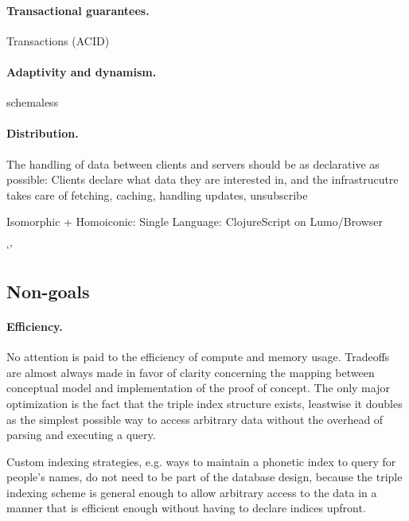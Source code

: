 \paragraph{Transactional guarantees.}
Transactions (ACID)


\paragraph{Adaptivity and dynamism.}
schemaless


\paragraph{Distribution.}
The handling of data between clients and servers should be as declarative as possible: Clients declare what data they are interested in, and the infrastrucutre takes care of fetching, caching, handling updates, unsubscribe

Isomorphic + Homoiconic: Single Language: ClojureScript on Lumo/Browser




`'\subsection{Non-goals}\label{sec:nongoals}


\paragraph{Efficiency.}
No attention is paid to the efficiency of compute and memory usage. Tradeoffs are almost always made in favor of clarity concerning the mapping between conceptual model and implementation of the proof of concept. The only major optimization is the fact that the triple index structure exists, leastwise it doubles as the simplest possible way to access arbitrary data without the overhead of parsing and executing a query.

Custom indexing strategies, e.g. ways to maintain a phonetic index to query for people's names, do not need to be part of the database design, because the triple indexing scheme is general enough to allow arbitrary access to the data in a manner that is efficient enough without having to declare indices upfront.

